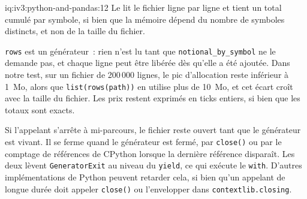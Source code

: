 \begin{solution}{iq:iv3:python-and-pandas:12}
Le  lit le fichier ligne par ligne et tient un total cumulé par symbole, si bien que la mémoire dépend du nombre de symboles distincts, et non de la taille du fichier.
\enlargethispage{-3\baselineskip}%
\label{lst:iv3:pp:stream}

\texttt{rows} est un générateur~: rien n'est lu tant que \texttt{notional\_by\_symbol} ne le demande pas, et chaque ligne peut être libérée dès qu'elle a été ajoutée. Dans notre test, sur un fichier de 200\,000 lignes, le pic d'allocation reste inférieur à 1~Mo, alors que \texttt{list(rows(path))} en utilise plus de 10~Mo, et cet écart croît avec la taille du fichier. Les prix restent exprimés en ticks entiers, si bien que les totaux sont exacts.

Si l'appelant s'arrête à mi-parcours, le fichier reste ouvert tant que le générateur est vivant. Il se ferme quand le générateur est fermé, par \texttt{close()} ou par le comptage de références de CPython lorsque la dernière référence disparaît. Les deux lèvent \texttt{GeneratorExit} au niveau du \texttt{yield}, ce qui exécute le \texttt{with}. D'autres implémentations de Python peuvent retarder cela, si bien qu'un appelant de longue durée doit appeler \texttt{close()} ou l'envelopper dans \texttt{contextlib.closing}.

\end{solution}

